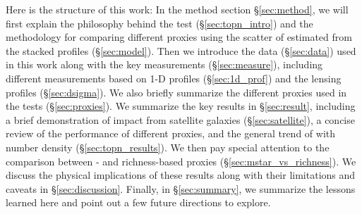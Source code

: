 \documentclass[fleqn,usenatbib,useAMS,english]{mnras}
\begin{document}



    Here is the structure of this work:
    In the method section \S \ref{sec:method}, we will first explain the
    philosophy behind the \topn{} test (\S \ref{sec:topn_intro}) and the methodology for
    comparing different \mhalo{} proxies using the scatter of \mhalo{} estimated from the
    stacked \dsigma{} profiles (\S \ref{sec:model}).
    Then we introduce the data (\S \ref{sec:data}) used in this work along with the key
    measurements (\S \ref{sec:measure}), including different \mstar{} measurements based on
    1-D profiles (\S \ref{sec:1d_prof}) and the \dsigma{} lensing profiles (\S \ref{sec:dsigma}).
    We also briefly summarize the different \mhalo{} proxies used in the \topn{} tests
    (\S \ref{sec:proxies}).
    We summarize the key results in \S \ref{sec:result}, including a
    brief demonstration of impact from satellite galaxies (\S \ref{sec:satellite}), a concise
    review of the performance of different \mhalo{} proxies, and the general trend of
    \sigmh{} with number density (\S \ref{sec:topn_results}).
    We then pay special attention to the comparison between \mstar{}- and richness-based
    \mhalo{} proxies (\S \ref{sec:mstar_vs_richness}).
    We discuss the physical implications of these results along with their limitations and
    caveats in \S \ref{sec:discussion}.
    Finally, in \S \ref{sec:summary}, we summarize the lessons learned here and point out a few
    future directions to explore.
\end{document}
